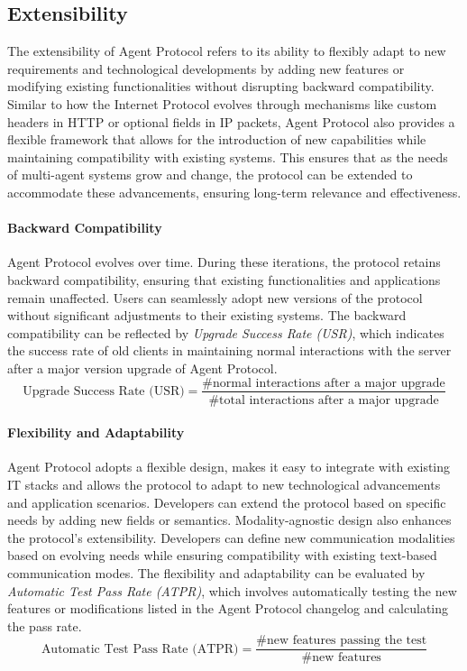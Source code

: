 \documentclass[10pt,preprint]{article}
\begin{document}
\subsection{Extensibility}
The extensibility of Agent Protocol refers to its ability to flexibly adapt to new requirements and technological developments by adding new features or modifying existing functionalities without disrupting backward compatibility. Similar to how the Internet Protocol evolves through mechanisms like custom headers in HTTP or optional fields in IP packets, Agent Protocol also provides a flexible framework that allows for the introduction of new capabilities while maintaining compatibility with existing systems. This ensures that as the needs of multi-agent systems grow and change, the protocol can be extended to accommodate these advancements, ensuring long-term relevance and effectiveness.

\paragraph{Backward Compatibility} Agent Protocol evolves over time. During these iterations, the protocol retains backward compatibility, ensuring that existing functionalities and applications remain unaffected. Users can seamlessly adopt new versions of the protocol without significant adjustments to their existing systems. The backward compatibility can be reflected by \textit{Upgrade Success Rate (USR)}, which indicates the success rate of old clients in maintaining normal interactions with the server after a major version upgrade of Agent Protocol.
\begin{equation}
    \text{Upgrade Success Rate (USR)}=\frac{\#\text{normal interactions after a major upgrade}}{\#\text{total interactions after a major upgrade}}
\end{equation}

\paragraph{Flexibility and Adaptability} Agent Protocol adopts a flexible design, makes it easy to integrate with existing IT stacks and allows the protocol to adapt to new technological advancements and application scenarios. Developers can extend the protocol based on specific needs by adding new fields or semantics. Modality-agnostic design also enhances the protocol's extensibility. Developers can define new communication modalities based on evolving needs while ensuring compatibility with existing text-based communication modes. The flexibility and adaptability can be evaluated by \textit{Automatic Test Pass Rate (ATPR)}, which involves automatically testing the new features or modifications listed in the Agent Protocol changelog and calculating the pass rate.
\begin{equation}
    \text{Automatic Test Pass Rate (ATPR)}=\frac{\#\text{new features passing the test}}{\#\text{new features}}
\end{equation}
\end{document}
